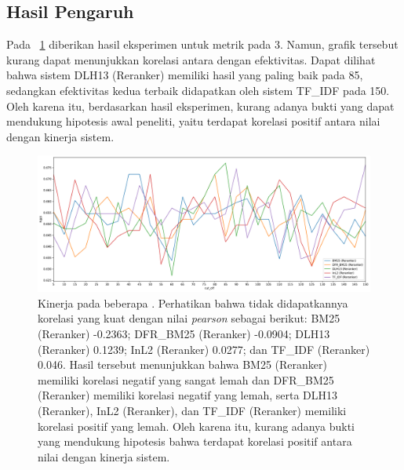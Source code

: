 \subsection{Hasil Pengaruh \CutOff{}}
\label{subbab:5::Hasil Pengaruh Cut-off}
Pada \gambar{}~\ref{grafik:cutoff} diberikan hasil eksperimen untuk metrik \recall{} pada \cutoff{} 3. Namun, grafik tersebut kurang dapat menunjukkan korelasi antara \cutoff{} dengan efektivitas. Dapat dilihat bahwa sistem DLH13 (Reranker) memiliki hasil yang paling baik pada \cutoff{} 85, sedangkan efektivitas kedua terbaik didapatkan oleh sistem TF\_IDF pada \cutoff{} 150. Oleh karena itu, berdasarkan hasil eksperimen, kurang adanya bukti yang dapat mendukung hipotesis awal peneliti, yaitu terdapat korelasi positif antara nilai \cutoff{} dengan kinerja sistem.
\begin{landscape}
    \begin{figure}
        \centering
        \includegraphics[scale=0.6]{assets/pdfs/Cut Off Experiment Results_3.pdf}
        \caption{Kinerja pada beberapa \cutoff{}. Perhatikan bahwa tidak didapatkannya korelasi yang kuat dengan nilai \textit{pearson} sebagai berikut: BM25 (Reranker) -0.2363; DFR\_BM25 (Reranker) -0.0904; DLH13 (Reranker) 0.1239; InL2 (Reranker) 0.0277; dan TF\_IDF (Reranker) 0.046. Hasil tersebut menunjukkan bahwa BM25 (Reranker) memiliki korelasi negatif yang sangat lemah dan DFR\_BM25 (Reranker) memiliki korelasi negatif yang lemah, serta DLH13 (Reranker), InL2 (Reranker), dan TF\_IDF (Reranker) memiliki korelasi positif yang lemah. Oleh karena itu, kurang adanya bukti yang mendukung hipotesis bahwa terdapat korelasi positif antara nilai \cutoff{} dengan kinerja sistem.}
        \label{grafik:cutoff}
    \end{figure}
\end{landscape}





